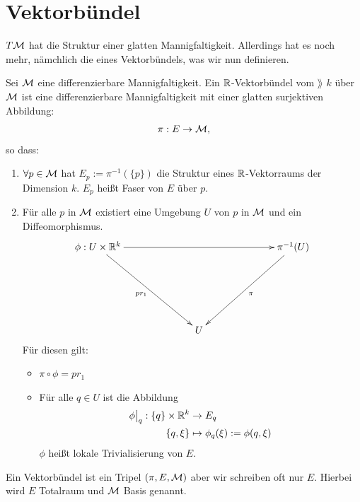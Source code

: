 \section{Vektorbündel}
$T\mathcal{M}$ hat die Struktur einer glatten Mannigfaltigkeit.
Allerdings hat es noch mehr, nämchlich die eines Vektorbündels, was wir nun definieren.
\begin{defs}[Vektorbündel]
Sei $\mathcal{M}$ eine differenzierbare Mannigfaltigkeit.
Ein $\mathbb{R}$-Vektorbündel vom $\rang$ $k$ über $\mathcal{M}$ ist eine differenzierbare Mannigfaltigkeit mit einer glatten surjektiven Abbildung:
\begin{align}
\pi: E \to \mathcal{M},
\end{align}
so dass:
\begin{enumerate}
\item $\forall p \in \mathcal{M}$ hat $E_p:= \pi^{-1}( \{ p \})$ die Struktur eines $\mathbb{R}$-Vektorraums der Dimension $k$.
$E_p$ heißt Faser von $E$ über $p$.
\item Für alle $p$ in $\mathcal{M}$ existiert eine Umgebung $U$ von $p$ in $\mathcal{M}$ und ein Diffeomorphismus.
\begin{align}
\begin{xy}
\xymatrix@=0.2\linewidth{
      \phi: U \times \R^k \ar[rr] \ar[rd]_{pr_1}  &     &  \pi^{-1}(U) \ar[dl]^{\pi}  \\
                             &  U  &}
\end{xy}
\end{align}
Für diesen gilt:
\begin{itemize}
\item $\pi \circ \phi = p r_1$
\item Für alle $q \in U$ ist die Abbildung
\begin{align}
\phi\big\vert_q : \{ q \} \times \mathbb{R}^k &\to E_q\\
\{ q, \xi \} &\mapsto \phi_q (\xi) := \phi(q, \xi)
\end{align}
$\phi$ heißt lokale Trivialisierung von $E$.
\end{itemize}
\end{enumerate}
\end{defs}
\begin{bem}
Ein Vektorbündel ist ein Tripel $(\pi, E, \mathcal{M})$ aber wir schreiben oft nur $E$. Hierbei wird $E$ Totalraum und $\mathcal{M}$ Basis genannt.
\end{bem}
